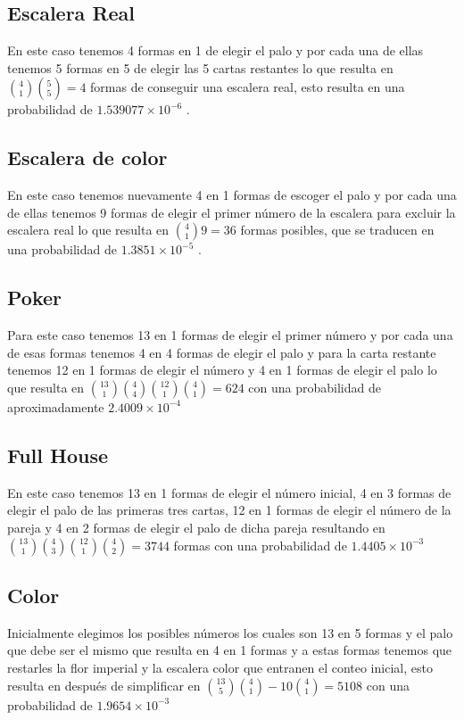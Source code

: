 \documentclass[letterpaper,11pt,dvipsnames]{article}
\begin{document}
\subsection{Escalera Real}
En este caso tenemos 4 formas en 1 de elegir el palo y por cada una de ellas tenemos 5 formas en 5 de elegir las 5 cartas restantes lo que resulta en \({{4}\choose{1}}{{5}\choose{5}}=4\) formas de conseguir una escalera real, esto resulta en una probabilidad de \(1.539077 \times 10^{-6}\) .
\subsection{Escalera de color}
En este caso tenemos nuevamente 4 en 1 formas de escoger el palo y por cada una de ellas tenemos 9 formas de elegir el primer número de la escalera para excluir la escalera real lo que resulta en \({{4}\choose{1}}9=36\) formas posibles, que se traducen en una probabilidad de \(1.3851\times 10^{-5}\) .
\subsection{Poker}
Para este caso tenemos 13 en 1 formas de elegir el primer número y por cada una de esas formas tenemos 4 en 4 formas de elegir el palo y para la carta restante tenemos 12 en 1 formas de elegir el número y 4 en 1 formas de elegir el palo lo que resulta en \({{13}\choose{1}}{{4}\choose{4}}{{12}\choose{1}}{{4}\choose{1}}=624\) con una probabilidad de aproximadamente  \(2.4009 \times 10^{-4}\)
\subsection{Full House}
En este caso tenemos 13 en 1 formas de elegir el número inicial, 4 en 3 formas de elegir el palo de las primeras tres cartas, 12 en 1 formas de elegir el número de la pareja y 4 en 2 formas de elegir el palo de dicha pareja resultando en \({{13}\choose{1}}{{4}\choose{3}}{{12}\choose{1}}{{4}\choose{2}}=3744\) formas con una probabilidad de \(1.4405 \times 10^{-3}\)
\subsection{Color}
Inicialmente elegimos los posibles números los cuales son 13 en 5 formas y el palo que debe ser el mismo que resulta en 4 en 1 formas y a estas formas tenemos que restarles la flor imperial y la escalera color que entranen el conteo inicial, esto resulta en después de simplificar en \({{13}\choose{5}}{{4}\choose{1}}-10{{4}\choose{1}}=5108\) con una probabilidad de \(1.9654 \times 10^{-3}\)
\end{document}

